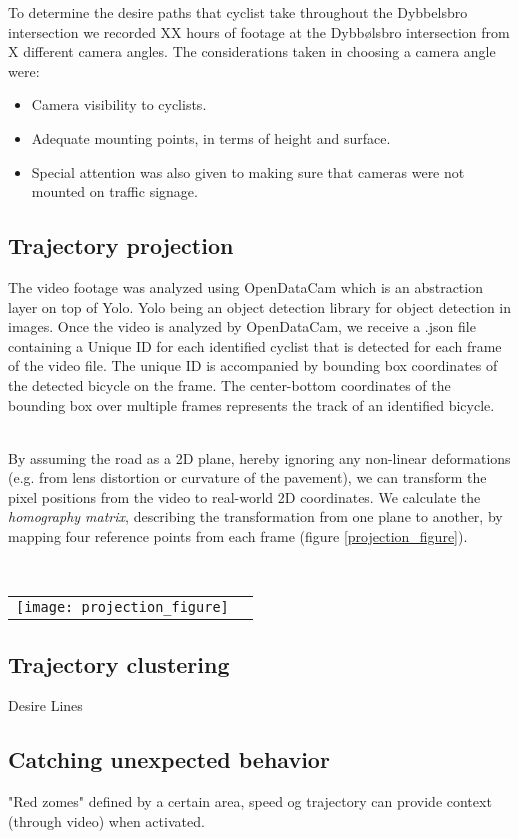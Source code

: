 To determine the desire paths that cyclist take throughout the Dybbelsbro intersection we recorded XX hours of footage 
at the Dybbølsbro intersection from X different camera angles.
The considerations taken in choosing a camera angle were:

\begin{itemize}
	\item Camera visibility to cyclists.
	\item Adequate mounting points, in terms of height and surface.
	\item Special attention was also given to making sure that cameras were not mounted on traffic signage.
\end{itemize}

\subsection{Trajectory projection}
The video footage was analyzed using OpenDataCam which is an abstraction layer on top of Yolo. Yolo being an object detection library for object detection in images.
Once the video is analyzed by OpenDataCam, we receive a .json file containing a Unique ID for each identified cyclist that is detected for each frame of the video file. 
The unique ID is accompanied by bounding box coordinates of the detected bicycle on the frame. 
The center-bottom coordinates of the bounding box over multiple frames represents the track of an identified bicycle.

\ \\
By assuming the road as a 2D plane, hereby ignoring any non-linear deformations (e.g. from lens distortion or curvature of the pavement), 
we can transform the pixel positions from the video to real-world 2D coordinates. 
We calculate the \textit{homography matrix}, describing the transformation from one plane to another, by mapping four reference points from each frame (figure \ref{projection_figure}).

\raggedbottom
\ \\ 
\noindent
\begin{tabular}{@{}cc}
\texttt{[image: projection\_figure]} 
\end{tabular}
\label{projection_figure}

\subsection{Trajectory clustering}
Desire Lines

\subsection{Catching unexpected behavior}
"Red zomes" defined by a certain area, speed og trajectory can provide context (through video) when activated. 

